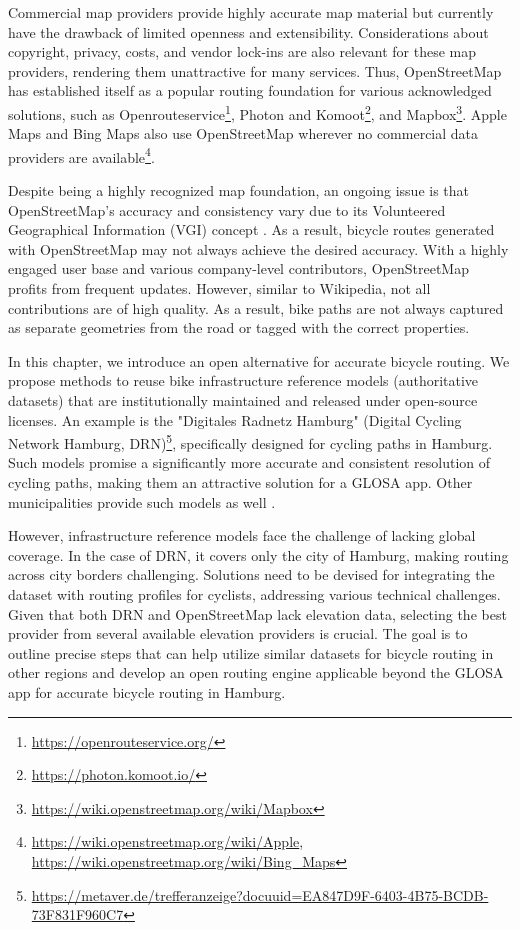 Commercial map providers provide highly accurate map material but currently have the drawback of limited openness and extensibility. Considerations about copyright, privacy, costs, and vendor lock-ins are also relevant for these map providers, rendering them unattractive for many services. Thus, OpenStreetMap has established itself as a popular routing foundation for various acknowledged solutions, such as Openrouteservice\footnote{\url{https://openrouteservice.org/}}, Photon and Komoot\footnote{\url{https://photon.komoot.io/}}, and Mapbox\footnote{\url{https://wiki.openstreetmap.org/wiki/Mapbox}}. Apple Maps and Bing Maps also use OpenStreetMap wherever no commercial data providers are available\footnote{\url{https://wiki.openstreetmap.org/wiki/Apple}, \url{https://wiki.openstreetmap.org/wiki/Bing_Maps}}. 

Despite being a highly recognized map foundation, an ongoing issue is that OpenStreetMap's accuracy and consistency vary due to its Volunteered Geographical Information (VGI) concept \cite{wasserman_evaluating_2019, jacobs_openstreetmap_2020, vybornova_automated_2023}. As a result, bicycle routes generated with OpenStreetMap may not always achieve the desired accuracy. With a highly engaged user base and various company-level contributors, OpenStreetMap profits from frequent updates. However, similar to Wikipedia, not all contributions are of high quality. As a result, bike paths are not always captured as separate geometries from the road or tagged with the correct properties.

In this chapter, we introduce an open alternative for accurate bicycle routing. We propose methods to reuse bike infrastructure reference models (authoritative datasets) that are institutionally maintained and released under open-source licenses. An example is the "Digitales Radnetz Hamburg" (Digital Cycling Network Hamburg, DRN)\footnote{\url{https://metaver.de/trefferanzeige?docuuid=EA847D9F-6403-4B75-BCDB-73F831F960C7}}, specifically designed for cycling paths in Hamburg. Such models promise a significantly more accurate and consistent resolution of cycling paths, making them an attractive solution for a GLOSA app. Other municipalities provide such models as well \cite{englede_efficient_2013, brovelli_towards_2017}. 

However, infrastructure reference models face the challenge of lacking global coverage. In the case of DRN, it covers only the city of Hamburg, making routing across city borders challenging. Solutions need to be devised for integrating the dataset with routing profiles for cyclists, addressing various technical challenges. Given that both DRN and OpenStreetMap lack elevation data, selecting the best provider from several available elevation providers is crucial. The goal is to outline precise steps that can help utilize similar datasets for bicycle routing in other regions and develop an open routing engine applicable beyond the GLOSA app for accurate bicycle routing in Hamburg.


